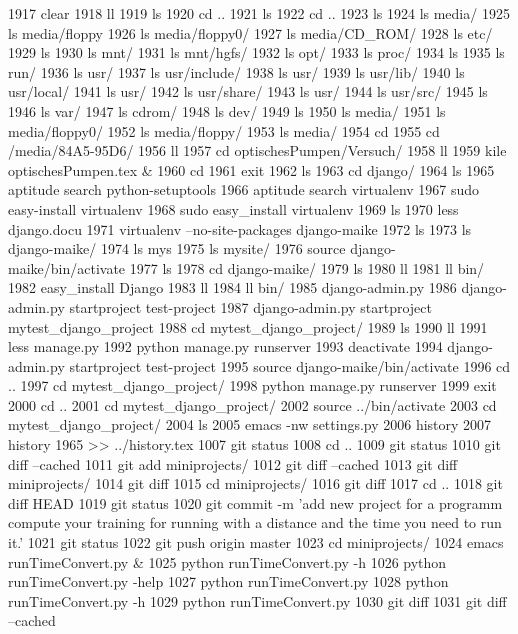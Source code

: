  1917  clear
 1918  ll
 1919  ls
 1920  cd ..
 1921  ls
 1922  cd ..
 1923  ls
 1924  ls media/
 1925  ls media/floppy
 1926  ls media/floppy0/
 1927  ls media/CD_ROM/
 1928  ls etc/
 1929  ls
 1930  ls mnt/
 1931  ls mnt/hgfs/
 1932  ls opt/
 1933  ls proc/
 1934  ls
 1935  ls run/
 1936  ls usr/
 1937  ls usr/include/
 1938  ls usr/
 1939  ls usr/lib/
 1940  ls usr/local/
 1941  ls usr/
 1942  ls usr/share/
 1943  ls usr/
 1944  ls usr/src/
 1945  ls
 1946  ls var/
 1947  ls cdrom/
 1948  ls dev/
 1949  ls
 1950  ls media/
 1951  ls media/floppy0/
 1952  ls media/floppy/
 1953  ls media/
 1954  cd
 1955  cd /media/84A5-95D6/
 1956  ll
 1957  cd optischesPumpen/Versuch/
 1958  ll
 1959  kile optischesPumpen.tex &
 1960  cd
 1961  exit
 1962  ls 
 1963  cd django/
 1964  ls
 1965  aptitude search python-setuptools
 1966  aptitude search virtualenv
 1967  sudo easy-install virtualenv
 1968  sudo easy_install virtualenv
 1969  ls
 1970  less django.docu
 1971  virtualenv --no-site-packages django-maike
 1972  ls
 1973  ls django-maike/
 1974  ls mys
 1975  ls mysite/
 1976  source django-maike/bin/activate
 1977  ls
 1978  cd django-maike/
 1979  ls
 1980  ll
 1981  ll bin/
 1982  easy_install Django
 1983  ll
 1984  ll bin/
 1985  django-admin.py 
 1986  django-admin.py startproject test-project
 1987  django-admin.py startproject mytest_django_project
 1988  cd mytest_django_project/
 1989  ls
 1990  ll
 1991  less manage.py 
 1992  python manage.py runserver
 1993  deactivate
 1994  django-admin.py startproject test-project
 1995  source django-maike/bin/activate
 1996  cd ..
 1997  cd mytest_django_project/
 1998  python manage.py runserver
 1999  exit
 2000  cd ..
 2001  cd mytest_django_project/
 2002  source ../bin/activate
 2003  cd mytest_django_project/
 2004  ls
 2005  emacs -nw settings.py
 2006  history 
 2007  history 1965 >> ../history.tex 
 1007  git status
 1008  cd ..
 1009  git status
 1010  git diff --cached
 1011  git add miniprojects/
 1012  git diff --cached
 1013  git diff miniprojects/
 1014  git diff
 1015  cd miniprojects/
 1016  git diff
 1017  cd ..
 1018  git diff HEAD
 1019  git status
 1020  git commit -m 'add new project for a programm compute your training for running with a distance and the time you need to run it.'
 1021  git status
 1022  git push origin master
 1023  cd miniprojects/
 1024  emacs runTimeConvert.py &
 1025  python runTimeConvert.py -h
 1026  python runTimeConvert.py -help
 1027  python runTimeConvert.py
 1028  python runTimeConvert.py -h
 1029  python runTimeConvert.py
 1030  git diff
 1031  git diff --cached
